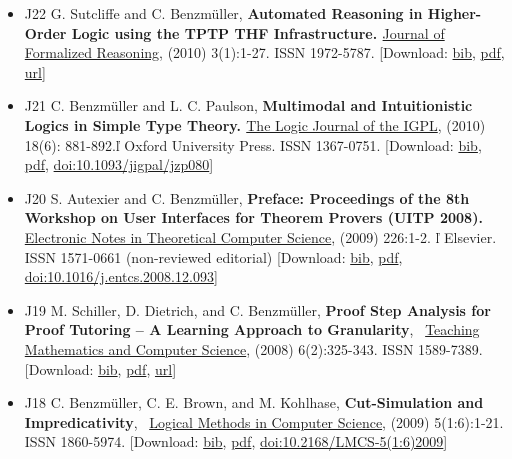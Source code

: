 \documentclass{article}
\newcommand{\tmstrong}[1]{\textbf{#1}}
\newcommand{\tmtextbf}[1]{{\bfseries{#1}}}
\newenvironment{itemizedot}{\begin{itemize} \renewcommand{\labelitemi}{$\bullet$}\renewcommand{\labelitemii}{$\bullet$}\renewcommand{\labelitemiii}{$\bullet$}\renewcommand{\labelitemiv}{$\bullet$}}{\end{itemize}}
\begin{document}
{{\begin{itemizedot}
  \item [J22] {\small G. Sutcliffe and C. Benzm\"uller, \tmtextbf{Automated
  Reasoning in Higher-Order Logic using the TPTP THF Infrastructure.
  }\href{http://jfr.cib.unibo.it/}{Journal of Formalized Reasoning}}, (2010)
  3(1):1-27. ISSN 1972-5787. {\color{grey} [Download: {\small
  \href{../papers/J22.bib}{bib},
  \href{http://jfr.cib.unibo.it/article/viewFile/1710/1179}{pdf}}, {\small
  \href{http://jfr.unibo.it/article/view/1710}{url}}]}
  
  \item [J21] {\small C. Benzm\"uller and L. C. Paulson, \tmtextbf{Multimodal
  and Intuitionistic Logics in Simple Type Theory.
  }\href{http://www3.oup.co.uk/igpl/}{The Logic Journal of the IGPL}}, (2010)
  18(6): 881-892.{\small  \v{l}  Oxford University Press.} ISSN 1367-0751.
  {\color{grey} [Download: {\small \href{../papers/J21.bib}{bib},
  \href{../papers/J21.pdf}{pdf}}, {\small
  \href{http://dx.doi.org/10.1093/jigpal/jzp080}{doi:10.1093/jigpal/jzp080}}]}
  
  \item [J20] S. Autexier and C. Benzm\"uller, \tmtextbf{Preface: Proceedings
  of the 8th Workshop on User Interfaces for Theorem Provers (UITP 2008).}
  \tmtextbf{
  }\href{http://www.elsevier.com/wps/find/journaldescription.cws\_home/681021/description\#description}{Electronic
  Notes in Theoretical Computer Science}, (2009) 226:1-2.  \v{l}  Elsevier.
  ISSN 1571-0661 (non-reviewed editorial) {\color{grey} [Download: {\small
  \href{../papers/J20.bib}{bib}}, {\small \href{../papers/J20.pdf}{pdf}},
  {\small
  \href{http://dx.doi.org/10.1016/j.entcs.2008.12.093}{doi:10.1016/j.entcs.2008.12.093}}]}
  
  \item [J19] M. Schiller, D. Dietrich, and C. Benzm\"uller, {\tmstrong{Proof
  Step Analysis for Proof Tutoring -- A Learning Approach to Granularity}}, \
  \href{http://tmcs.math.klte.hu/}{Teaching Mathematics and Computer Science},
  (2008) 6(2):325-343. ISSN 1589-7389. {\color{grey} [Download: {\small
  \href{../papers/J19.bib}{bib}}, {\small \href{../papers/J19.pdf}{pdf}},
  {\small \href{http://tmcs.math.klte.hu/}{url}}]}
  
  \item [J18] C. Benzm\"uller, C. E. Brown, and M. Kohlhase,
  {\tmstrong{Cut-Simulation and Impredicativity}}, \
  \href{http://www.lmcs-online.org/}{Logical Methods in Computer Science},
  (2009) 5(1:6):1-21. ISSN 1860-5974. {\color{grey} [Download: {\small
  \href{../papers/J18.bib}{bib}}, {\small \href{../papers/J18.pdf}{pdf}},
  {\small
  {\tmstrong{}}\href{http://dx.doi.org/10.2168/LMCS-5(1:6)2009}{doi:10.2168/LMCS-5(1:6)2009{\tmstrong{}}}}]}
  

\end{itemizedot}}}
\end{document}
